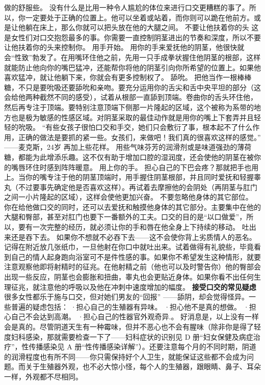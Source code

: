 \documentclass[12pt,UTF8,openany]{ctexbook}
\begin{document}
做的舒服些。
没有什么是比用一种令人尴尬的体位来进行口交更糟糕的事了。所以，你一定要处于正确的位置上。他可以坐着或站着，而你则可以跪在他前方。或是让他躺在床上，那么你就可以把头放在他的大腿之间。
不要让他扶着你的头
这是女性们对口交抱怨最多的事。你需要一直控制阴茎进出的节奏和深度，所以不要让他扶着你的头来控制你。
用手开始。
用你的手来爱抚他的阴茎，他很快就会“性致”勃发了。在用嘴环住他之前，先用一只手成拳状握住他阴茎的根部，这样就能防止他向你的嘴巴猛冲，还能帮你将他的阴茎引向你所希望的位置上。如果他喜欢猛冲，就让他躺下来，你就会有更多控制权了。
舔吮。
把他当作一根棒棒糖，不只是要吮吸还要舔吮和亲吻。要充分运用你的舌尖和舌中央平坦的部分（这会给他两种截然不同的感受），试着从根部一直舔到顶端。卷曲你的舌头环住他，然后再专注于顶端。要特别注意顶端下侧那一片隆起的区域，这个被称为系带的地方也是极为敏感的性感区域。对阴茎采取的最佳动作就是用你的嘴上下套弄并且轻轻的吮吸。
“有些女孩子很怕口交和手交，她们只会敷衍了事，根本起不了什么作用，正确的做法是要抓的紧一些。女孩们，来做吧！我们真的很喜欢这样的感觉。”
——麦克斯，24岁
再加上些花样。
用些气味芬芳的润滑剂或是味道强劲的薄荷糖，都能为此增添乐趣。这不仅有助于增加口腔的湿润度，还会使他的阴茎在被你的嘴唇环住时感到阵阵暖意。
用上你的手。
担心自己的下巴会疼？那就把手也用上。当你的嘴专注于他的阴茎顶端时，用手握住阴茎根部，并且同时爱抚和轻握睾丸（不过要事先确定他是否喜欢这样）。再试着去摩擦他的会阴处（再阴茎与肛门之间一小片隆起的区域），这样会使他更加兴奋。
不要忽略他身体的其它部位。
你在给他做口交的同时，还可以去爱抚和触摸他身体的其它部分。主要集中在他的大腿和臀部，甚至对肛门也要下一番额外的工夫。口交的目的是“以口做爱”，所以，要有一次完整的经历，就必须让你的手和唇在他全身上下持续的移动。
吐出来还是吞下去。
如果你不想就不必吞下去——这不会使你背上劣质情人的恶名。记得在附近放几张纸巾，一旦他射在你口中就吐出来。试着做得有礼貌些，毕竟看到自己的情人起身跑向浴室可不是件性感的事。如果你不希望发生这种情形，就要注意观察他即将射精时的征兆。在他射精之前（他也可以及时警告你）他的臀部会出现一些反应，阴茎也会膨胀和扭曲，睾丸也会更贴近身体。如果你看不出任何生理征兆，就注意他的呼吸以及他在冲刺中速度增加的幅度。
\textbf{接受口交的常见疑虑}
很多女性都乐于施与口交，但对她们男友的“回报” ——舔阴，却会觉得怪异。一些普遍的疑虑包括：
·担心自己的生殖器有异味。
·担心他不是真的想做。
·担心自己不会达到高潮。
·担心自己的性器官外观奇异.。
好消息是，以上没有一样会是真的。尽管阴道天生有一种霉味，但并不恶心也不会有腥味（除非你是得了轻度妇科感染，那就需要检查一下了——妇科症状的识别见 D 册“妇女保健及病症治疗”，性传播感染见 A 册“性传播感染详解”）。还要注意每个月的不同时期，阴道的润滑程度也有所不同——你只需保持好个人卫生，就能保证这些都不会成为问题。而关于生殖器外观，也不必大惊小怪，每个人的生殖器，跟眼睛、鼻子、耳朵一样，外观都不尽相同。
\end{document}
